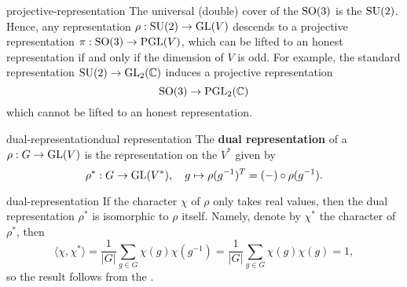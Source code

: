 \begin{example}{projective-representation}
    The universal (double) cover of the  $\textup{SO}(3)$ is the  $\textup{SU}(2)$. Hence, any representation $\rho : \textup{SU}(2) \to \textup{GL}(V)$ descends to a projective representation $\pi : \textup{SO}(3) \to \textup{PGL}(V)$, which can be lifted to an honest representation if and only if the dimension of $V$ is odd. For example, the standard representation $\textup{SU}(2) \to \textup{GL}_2(\mathbb{C})$ induces a projective representation
    \[ \textup{SO}(3) \to \textup{PGL}_2(\mathbb{C}) \]
    which cannot be lifted to an honest representation.
\end{example}


\begin{topic}{dual-representation}{dual representation}
    The \textbf{dual representation} of a  $\rho : G \to \textup{GL}(V)$ is the representation on the  $V^*$ given by
    \[ \rho^* : G \to \textup{GL}(V^*), \quad g \mapsto \rho(g^{-1})^T = (-) \circ \rho(g^{-1}) . \]
\end{topic}

\begin{example}{dual-representation}
    If the character $\chi$ of $\rho$ only takes real values, then the dual representation $\rho^*$ is isomorphic to $\rho$ itself. Namely, denote by $\chi^*$ the character of $\rho^*$, then
    \[ \langle \chi, \chi^* \rangle = \frac{1}{|G|} \sum_{g \in G} \chi(g) \chi(g^{-1}) = \frac{1}{|G|} \sum_{g \in G} \chi(g) \chi(g) = 1 , \]
    so the result follows from the .
\end{example}


